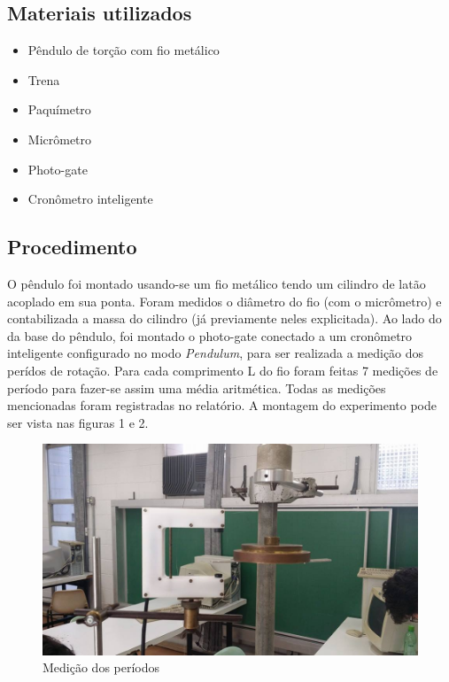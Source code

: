 \documentclass[12pt,a4paper]{article}
\begin{document}
\subsection{Materiais utilizados}
\begin{itemize}
	\item Pêndulo de torção com fio metálico
	\item Trena
	\item Paquímetro
	\item Micrômetro
	\item Photo-gate
	\item Cronômetro inteligente
\end{itemize}

\subsection{Procedimento}
O pêndulo foi montado usando-se um fio metálico tendo um cilindro de latão acoplado em sua ponta. Foram medidos o diâmetro do fio (com o micrômetro) e contabilizada a massa do cilindro (já previamente neles explicitada). Ao lado do da base do pêndulo, foi montado o photo-gate conectado a um cronômetro inteligente configurado no modo \emph{Pendulum}, para ser realizada a medição dos perídos de rotação. Para cada comprimento L do fio foram feitas 7 medições de período para fazer-se assim uma média aritmética. Todas as medições mencionadas foram registradas no relatório.  A montagem do experimento pode ser vista nas figuras 1 e 2.

\begin{figure}[!htbp]
	\includegraphics[scale=0.50]{03.jpg}
	\caption{Medição dos períodos}
	\label{fig:cilindro}
\end{figure}
\end{document}
